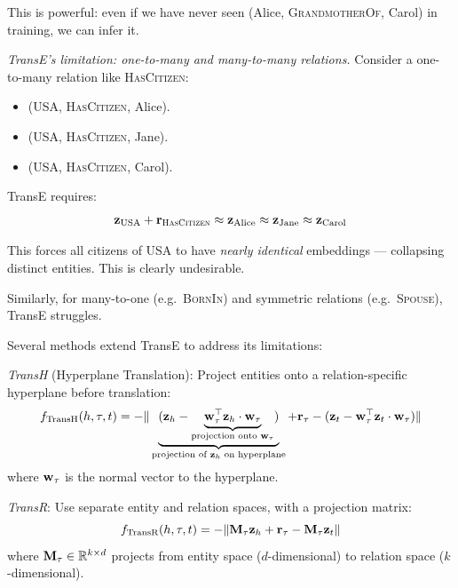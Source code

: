 \begin{notechapter}
\begin{example}
This is powerful: even if we have never seen (Alice, \textsc{GrandmotherOf}, Carol) in training, we can infer it.
\end{example}

\begin{keyidea}
\emph{TransE's limitation: one-to-many and many-to-many relations.}
Consider a one-to-many relation like \textsc{HasCitizen}:
\begin{itemize}
    \item (USA, \textsc{HasCitizen}, Alice).
    \item (USA, \textsc{HasCitizen}, Jane).
    \item (USA, \textsc{HasCitizen}, Carol).
\end{itemize}

TransE requires:
\[
\mathbf{z}_{\text{USA}} + \mathbf{r}_{\textsc{HasCitizen}} \approx \mathbf{z}_{\text{Alice}} \approx \mathbf{z}_{\text{Jane}} \approx \mathbf{z}_{\text{Carol}}
\]

This forces all citizens of USA to have \emph{nearly identical} embeddings --- collapsing distinct entities. This is clearly undesirable.

Similarly, for many-to-one (e.g.\ \textsc{BornIn}) and symmetric relations (e.g.\ \textsc{Spouse}), TransE struggles.
\end{keyidea}

\begin{definition}
Several methods extend TransE to address its limitations:

\emph{TransH} (Hyperplane Translation): Project entities onto a relation-specific hyperplane before translation:
\begin{equation}
f_{\text{TransH}}(h, \tau, t) = - \|
\underbrace{( \mathbf{z}_h - \underbrace{\mathbf{w}_\tau^\top \mathbf{z}_h \cdot
\mathbf{w}_\tau}_{\text{projection onto } \mathbf{w}_\tau})}_{\text{projection of } \mathbf{z}_h \text{ on hyperplane}}
+ \mathbf{r}_\tau
- (\mathbf{z}_t - \mathbf{w}_\tau^\top \mathbf{z}_t \cdot \mathbf{w}_\tau)
\|
\end{equation}
where $\mathbf{w}_\tau$ is the normal vector to the hyperplane.

\emph{TransR}: Use separate entity and relation spaces, with a projection matrix:
\begin{equation}
f_{\text{TransR}}(h, \tau, t) = -\|\mathbf{M}_\tau \mathbf{z}_h + \mathbf{r}_\tau - \mathbf{M}_\tau \mathbf{z}_t\|
\end{equation}
where $\mathbf{M}_\tau \in \mathbb{R}^{k \times d}$ projects from entity space ($d$-dimensional) to relation space ($k$-dimensional).
\end{definition}


\end{notechapter}
